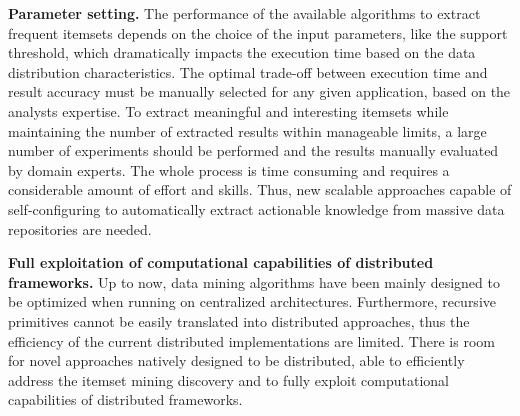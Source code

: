 \textbf{Parameter setting.}
The performance of the available algorithms to extract frequent
itemsets depends on the choice of the input parameters, like the support
threshold, which dramatically impacts the execution time based on the data
distribution characteristics. The optimal trade-off between execution time and
result accuracy must be manually selected for any given application, based on
the
analysts expertise.
To extract meaningful and interesting itemsets while maintaining the
number of extracted results within manageable limits, a large number of
experiments should be performed and the results
manually evaluated by domain experts.
The whole process is time consuming and requires a considerable
amount of effort and skills. Thus, new scalable approaches
capable of self-configuring to automatically extract actionable
knowledge from massive data repositories
are needed.

\textbf{Full exploitation of computational capabilities of distributed
frameworks.}
Up to now, data mining algorithms have been mainly designed to be
optimized when running on centralized architectures.
Furthermore, recursive primitives cannot be easily translated into
distributed approaches,
thus the efficiency of the current distributed
implementations are limited.
There is room for novel approaches natively
designed to be distributed, able to efficiently address the itemset
mining discovery and to fully exploit computational capabilities of
distributed frameworks.

